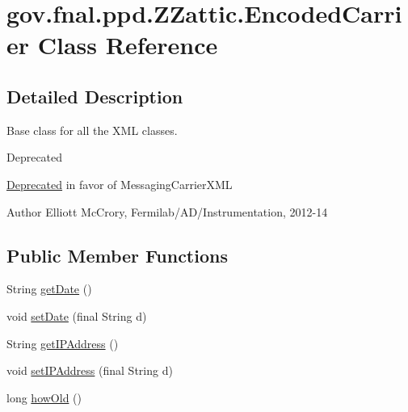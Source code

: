 \hypertarget{classgov_1_1fnal_1_1ppd_1_1ZZattic_1_1EncodedCarrier}{\section{gov.\-fnal.\-ppd.\-Z\-Zattic.\-Encoded\-Carrier Class Reference}
\label{classgov_1_1fnal_1_1ppd_1_1ZZattic_1_1EncodedCarrier}
}


\subsection{Detailed Description}
Base class for all the X\-M\-L classes. \begin{DoxyRefDesc}{Deprecated}
\item[\hyperlink{deprecated__deprecated000010}{Deprecated}]in favor of Messaging\-Carrier\-X\-M\-L\end{DoxyRefDesc}


\begin{DoxyAuthor}{Author}
Elliott Mc\-Crory, Fermilab/\-A\-D/\-Instrumentation, 2012-\/14 
\end{DoxyAuthor}
\subsection*{Public Member Functions}
\begin{DoxyCompactItemize}
\item 
String \hyperlink{classgov_1_1fnal_1_1ppd_1_1ZZattic_1_1EncodedCarrier_a78d0cd10e1a13e78e697e6559b265aa5}{get\-Date} ()
\item 
void \hyperlink{classgov_1_1fnal_1_1ppd_1_1ZZattic_1_1EncodedCarrier_aec293d5ce2d9ca7c8c13091085c4cad8}{set\-Date} (final String d)
\item 
String \hyperlink{classgov_1_1fnal_1_1ppd_1_1ZZattic_1_1EncodedCarrier_a099c08a698c6dad95fe960430c7d24e2}{get\-I\-P\-Address} ()
\item 
void \hyperlink{classgov_1_1fnal_1_1ppd_1_1ZZattic_1_1EncodedCarrier_aeddf788b5506883bd7398d45f2115497}{set\-I\-P\-Address} (final String d)
\item 
long \hyperlink{classgov_1_1fnal_1_1ppd_1_1ZZattic_1_1EncodedCarrier_ab4252d10a9b8b817738c26305dc0fa23}{how\-Old} ()
\end{DoxyCompactItemize}
